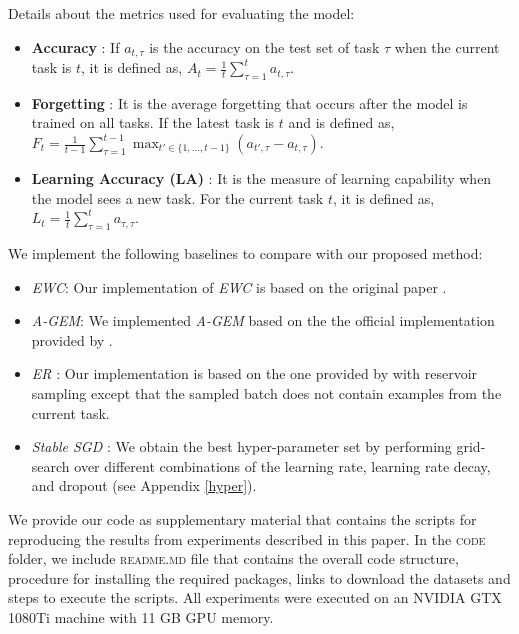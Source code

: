 \documentclass{article} \usepackage{collas2022_conference,times}
\begin{document}
Details about the metrics used for evaluating the model: 
    \begin{itemize}
        \item \textbf{Accuracy} \citep{lopez2017gradient}: If $a_{t,\tau}$ is the accuracy on the test set of task $\tau$ when the current task is $t$, it is defined as,  
      $
        A_t = \frac{1}{t}\sum\limits_{\tau=1}^t a_{t,\tau}
        $.
        \item \textbf{Forgetting} \citep{chaudhry2018riemannian}: It is the average forgetting that occurs after the model is trained on all tasks. If the latest task is $t$ and is defined as,
        $
        F_t = \frac{1}{t-1}\sum\limits_{\tau=1}^{t-1} \max_{t' \in \{1,...,t-1\}} (a_{t',\tau} - a_{t,\tau})
        $.
        \item \textbf{Learning Accuracy (LA)} \citep{riemer2018learning}: It is the measure of learning capability when the model sees a new task. For the current task $t$, it is defined as, 
        $
        L_t = \frac{1}{t}\sum\limits_{\tau=1}^{t} a_{\tau,\tau}
        $.
    \end{itemize}

{
We implement the following baselines to compare with our proposed method:
\begin{itemize}
    \item \textit{EWC}: Our implementation of \textit{EWC} is based on the original paper \citep{kirkpatrick2017overcoming}.
    \item \textit{A-GEM}: We implemented \textit{A-GEM} based on the the official implementation provided by \citep{chaudhry2018efficient}.
    \item \textit{ER} \citep{chaudhry2019tiny}: Our implementation is based on the one provided by \citep{aljundi2019online} with reservoir sampling except that the sampled batch does not contain examples from the current task. 
	\item \textit{Stable SGD} \citep{mirzadeh2020understanding}: We obtain the best hyper-parameter set by performing grid-search over different combinations of the learning rate, learning rate decay, and dropout (see Appendix \ref{hyper}). 
\end{itemize}
}


We provide our code as supplementary material that contains the scripts for reproducing the results from experiments described in this paper. In the \textsc{code} folder, we include \textsc{readme.md} file that contains the overall code structure, procedure for installing the required packages, links to download the datasets and steps to execute the scripts. All experiments were executed on an NVIDIA GTX 1080Ti machine with 11 GB GPU memory. 
\end{document}
